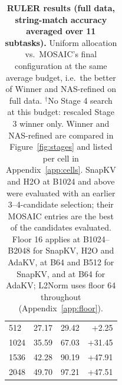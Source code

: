 \begin{table}[t]
\begin{tabular}{@{} l r r r @{}}
    \rowcolor{gray!10}
    512 & 27.17 & 29.42 & +2.25 \\
    1024 & 35.59 & 67.03 & +31.45 \\
    \rowcolor{gray!10}
    1536 & 42.28 & 90.19 & +47.91 \\
    2048 & 49.70 & 97.21 & +47.51 \\
    \bottomrule
  \end{tabular}
  \caption{\textbf{RULER results (full data, string-match accuracy averaged over 11 subtasks).} Uniform allocation vs.\ MOSAIC's final configuration at the same average budget, i.e.\ the better of Winner and NAS-refined on full data. $^\dagger$No Stage 4 search at this budget: rescaled Stage 3 winner only. Winner and NAS-refined are compared in Figure~\ref{fig:stages} and listed per cell in Appendix~\ref{app:cells}. SnapKV and H2O at B1024 and above were evaluated with an earlier 3--4-candidate selection; their MOSAIC entries are the best of the candidates evaluated. Floor 16 applies at B1024--B2048 for SnapKV, H2O and AdaKV, at B64 and B512 for SnapKV, and at B64 for AdaKV; L2Norm uses floor 64 throughout (Appendix~\ref{app:floor}).}
  \label{tab:ruler-summary}
\end{table}
